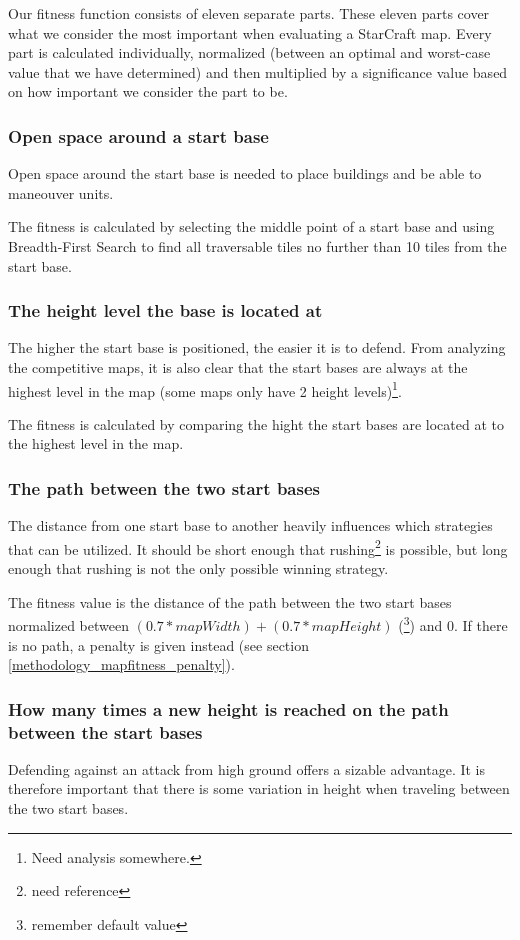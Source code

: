 Our fitness function consists of eleven separate parts. These eleven parts cover what we consider the most important when evaluating a StarCraft map. Every part is calculated individually, normalized (between an optimal and worst-case value that we have determined) and then multiplied by a significance value based on how important we consider the part to be.

	\subsubsection*{Open space around a start base} 
	Open space around the start base is needed to place buildings and be able to maneouver units. 

	The fitness is calculated by selecting the middle point of a start base and using Breadth-First Search to find all traversable tiles no further than 10 tiles from the start base.

	\subsubsection*{The height level the base is located at}
	The higher the start base is positioned, the easier it is to defend. From analyzing the competitive maps, it is also clear that the start bases are always at the highest level in the map (some maps only have 2 height levels)\footnote{Need analysis somewhere.}. 

	The fitness is calculated by comparing the hight the start bases are located at to the highest level in the map. 

	\subsubsection*{The path between the two start bases}
	The distance from one start base to another heavily influences which strategies that can be utilized. It should be short enough that rushing\footnote{need reference} is possible, but long enough that rushing is not the only possible winning strategy. 

	The fitness value is the distance of the path between the two start bases normalized between $(0.7 * mapWidth) + (0.7 * mapHeight)$ (\footnote{remember default value}) and 0. If there is no path, a penalty is given instead (see section \ref{methodology_mapfitness_penalty}).

	\subsubsection*{How many times a new height is reached on the path between the start bases}
	Defending against an attack from high ground offers a sizable advantage. It is therefore important that there is some variation in height when traveling between the two start bases. 

